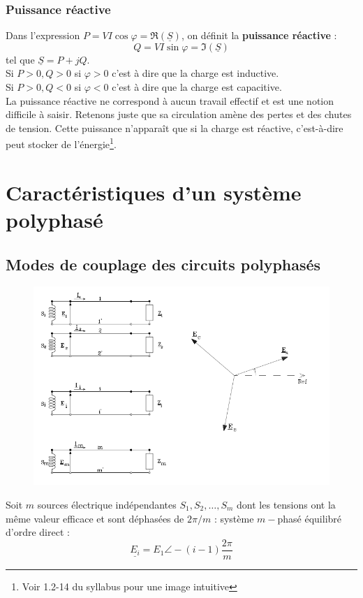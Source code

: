 \subsubsection{Puissance réactive}
Dans l'expression $P = VI \cos\varphi = \Re(\underline{S})$, on définit la 
\textbf{puissance réactive} :
\begin{equation}
	Q = VI\sin\varphi = \Im(\underline{S})
\end{equation}
tel que $\underline{S} = P+jQ$.\\
Si $P>0, Q>0$ si $\varphi>0$ c'est à dire que la charge est inductive.\\
Si $P>0, Q<0$ si $\varphi<0$ c'est à dire que la charge est capacitive.\\
			
La puissance réactive ne correspond à aucun travail effectif et est une 
notion difficile à saisir. Retenons juste que sa circulation amène des 
pertes et des chutes de tension. Cette puissance n'apparaît que si la 
charge est réactive, c'est-à-dire peut stocker de l'énergie\footnote{Voir 
1.2-14 du syllabus pour une image intuitive}.
\newpage		
\section{Caractéristiques d'un système polyphasé}
\subsection{Modes de couplage des circuits polyphasés}
\begin{figure}
	\vspace{-8mm}
	\includegraphics[scale=0.34]{ch1/image5.png}
\end{figure}	
Soit $m$ sources électrique indépendantes $S_1, S_2,\dots,S_m$ dont les tensions 
ont la même valeur efficace et sont déphasées de $2\pi/m$ : système $m-$phasé 
équilibré d'ordre direct :
\begin{equation}
	\underline{E_i} = E_{1} \angle -(i-1)\frac{2\pi}{m}
\end{equation}


